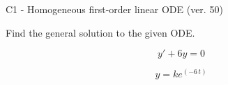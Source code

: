 \begin{exercise}
  \begin{exerciseTitle}C1 - Homogeneous first-order linear ODE (ver. 50)\end{exerciseTitle}
  \begin{exerciseStatement}
    
Find the general solution to the given ODE.

    
\[y'+6y=0\]

  \end{exerciseStatement}
  \begin{exerciseAnswer}
    
\[y= k e^{\left(-6 \, t\right)}\]

  \end{exerciseAnswer}
\end{exercise}